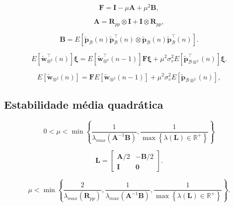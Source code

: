 \begin{equation*}
    \mathbf{F} = \mathbf{I} -\mu\mathbf{A} + \mu^2\mathbf{B},
\end{equation*}

\begin{equation*}
    \mathbf{A} = \mathbf{R}_{pp}\otimes\mathbf{I} + \mathbf{I}\otimes\mathbf{R}_{pp},
\end{equation*}

\begin{equation*}
    \mathbf{B} = E\left[ \tilde{\mathbf{p}}_\mathcal{B}(n)\tilde{\mathbf{p}}^\top_\mathcal{B}(n) \otimes \tilde{\mathbf{p}}_\mathcal{B}(n)\tilde{\mathbf{p}}^\top_\mathcal{B}(n)\right].
\end{equation*}

\begin{equation}
    E\left[ \tilde{\mathbf{w}}^\top_{\otimes^2}(n)\right] \boldsymbol{\xi} = E\left[ \tilde{\mathbf{w}}^\top_{\otimes^2}(n-1) \right]\mathbf{F}\boldsymbol{\xi} +\mu^2 \sigma_{v}^2E\left[ \tilde{\mathbf{p}}^\top_{\mathcal{B}\otimes^2}(n) \right]\boldsymbol{\xi}.
\end{equation}

\begin{equation}
    E\left[ \tilde{\mathbf{w}}_{\otimes^2}(n)\right]  = \mathbf{F}E\left[ \tilde{\mathbf{w}}_{\otimes^2}(n-1) \right] +\mu^2 \sigma_{v}^2E\left[ \tilde{\mathbf{p}}_{\mathcal{B}\otimes^2}(n) \right],\label{eq:Ewkron2_last}
\end{equation}

\subsection{Estabilidade média quadrática}

\begin{equation}
    0<\mu<\min \left\{\frac{1}{\lambda_{max}(\mathbf{A}^{-1}\mathbf{B})},\frac{1}{\max\left\{\lambda(\mathbf{L})\in\mathbb{R}^{+}\right\}} \right\}
\end{equation}

\begin{equation}
    \mathbf{L} = \begin{bmatrix}
        \mathbf{A}/2 & -\mathbf{B}/2\\
        \mathbf{I} & \mathbf{0}
    \end{bmatrix}.
\end{equation}

\begin{equation}
    \mu<\min \left\{\frac{2}{\lambda_{max}(\mathbf{R}_{pp})},\frac{1}{\lambda_{max}(\mathbf{A}^{-1}\mathbf{B})},\frac{1}{\max\left\{\lambda(\mathbf{L})\in\mathbb{R}^{+}\right\}} \right\}.
\end{equation}

